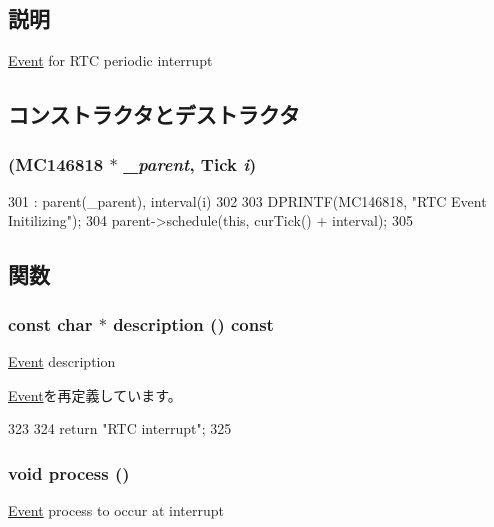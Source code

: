 \subsection{説明}
\hyperlink{classEvent}{Event} for RTC periodic interrupt 

\subsection{コンストラクタとデストラクタ}
\hypertarget{structMC146818_1_1RTCEvent_ad20105f1a208e8590da95c6f556f6b6f}{
\subsubsection[{RTCEvent}]{ ({\bf MC146818} $\ast$ {\em \_\-parent}, \/  {\bf Tick} {\em i})}}
\label{structMC146818_1_1RTCEvent_ad20105f1a208e8590da95c6f556f6b6f}



\begin{DoxyCode}
301     : parent(_parent), interval(i)
302 {
303     DPRINTF(MC146818, "RTC Event Initilizing\n");
304     parent->schedule(this, curTick() + interval);
305 }
\end{DoxyCode}


\subsection{関数}
\hypertarget{structMC146818_1_1RTCEvent_a5a14fe478e2393ff51f02e9b7be27e00}{
\subsubsection[{description}]{\setlength{\rightskip}{0pt plus 5cm}const char $\ast$ description () const}}
\label{structMC146818_1_1RTCEvent_a5a14fe478e2393ff51f02e9b7be27e00}
\hyperlink{classEvent}{Event} description 

\hyperlink{classEvent_a130ddddf003422b413e2e891b1b80e8f}{Event}を再定義しています。


\begin{DoxyCode}
323 {
324     return "RTC interrupt";
325 }
\end{DoxyCode}
\hypertarget{structMC146818_1_1RTCEvent_a2e9c5136d19b1a95fc427e0852deab5c}{
\subsubsection[{process}]{\setlength{\rightskip}{0pt plus 5cm}void process ()}}
\label{structMC146818_1_1RTCEvent_a2e9c5136d19b1a95fc427e0852deab5c}
\hyperlink{classEvent}{Event} process to occur at interrupt 

